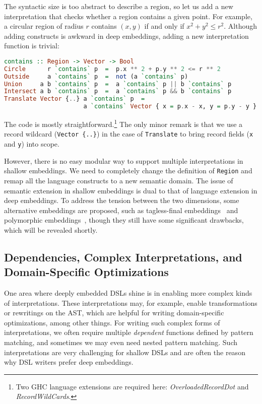 The syntactic size is too abstract to describe a region, so let us add a new
interpretation that checks whether a region contains a given point. For example,
a circular region of radius $r$ contains $(x,y)$ if and only if $x^2 + y^2 \le
r^2$. Although adding constructs is awkward in deep embeddings, adding a new
interpretation function is trivial:

\begin{lstlisting}[language=Haskell]
contains :: Region -> Vector -> Bool
Circle      r `contains` p  =  p.x ** 2 + p.y ** 2 <= r ** 2
Outside     a `contains` p  =  not (a `contains` p)
Union     a b `contains` p  =  a `contains` p || b `contains` p
Intersect a b `contains` p  =  a `contains` p && b `contains` p
Translate Vector {..} a `contains` p  =
                      a `contains` Vector { x = p.x - x, y = p.y - y }
\end{lstlisting}

\noindent
The code is mostly straightforward.\footnote{Two GHC language extensions are
required here: \emph{OverloadedRecordDot} and \emph{RecordWildCards}.} The only
minor remark is that we use a record wildcard (\lstinline|Vector {..}|) in the
case of \lstinline{Translate} to bring record fields (\lstinline{x} and
\lstinline{y}) into scope.

However, there is no easy modular way to support multiple interpretations in
shallow embeddings. We need to completely change the definition of
\lstinline{Region} and remap all the language constructs to a new semantic
domain. The issue of semantic extension in shallow embeddings is dual to that of
language extension in deep embeddings. To address the tension between the two
dimensions, some alternative embeddings are proposed, such as tagless-final
embeddings~\citep{carette2009finally,kiselyov2010typed} and polymorphic
embeddings~\citep{hofer2008polymorphic}, though they still have some significant
drawbacks, which will be revealed shortly.

\subsection{Dependencies, Complex Interpretations, and Domain-Specific Optimizations} \label{sec:transform}

One area where deeply embedded DSLs shine is in enabling more complex kinds of
interpretations. These interpretations may, for example, enable transformations
or rewritings on the AST, which are helpful for writing domain-specific
optimizations, among other things. For writing such complex forms of
interpretations, we often require multiple \emph{dependent} functions defined by
pattern matching, and sometimes we may even need nested pattern matching. Such
interpretations are very challenging for shallow DSLs and are often the reason
why DSL writers prefer deep embeddings.

